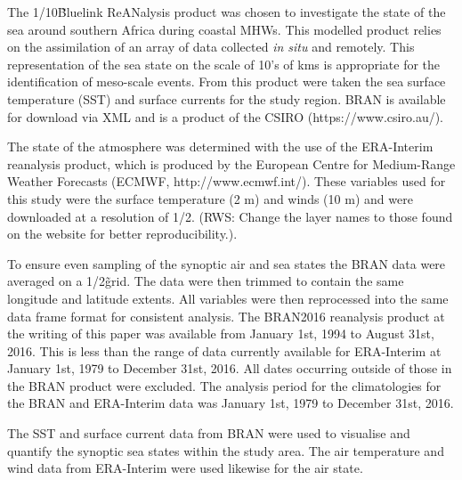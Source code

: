 \documentclass[a4paper,10pt,review]{elsarticle}
\begin{document}
The 1/10\degree\~ Bluelink ReANalysis product was chosen to investigate the state of the sea around southern Africa during coastal MHWs. This modelled product relies on the assimilation of an array of data collected \emph{in situ} and remotely. This representation of the sea state on the scale of 10's of kms is appropriate for the identification of meso-scale events. From this product were taken the sea surface temperature (SST) and surface currents for the study region. BRAN is available for download via XML and is a product of the CSIRO (https://www.csiro.au/).

The state of the atmosphere was determined with the use of the ERA-Interim reanalysis product, which is produced by the European Centre for Medium-Range Weather Forecasts (ECMWF, http://www.ecmwf.int/). These variables used for this study were the surface temperature (2 m) and winds (10 m) and were downloaded at a resolution of 1/2\degree. (RWS: Change the layer names to those found on the website for better reproducibility.). 

To ensure even sampling of the synoptic air and sea states the BRAN data were averaged on a 1/2\degree\~ grid. The data were then trimmed to contain the same longitude and latitude extents. All variables were then reprocessed into the same data frame format for consistent analysis. The BRAN2016 reanalysis product at the writing of this paper was available from January 1st, 1994 to August 31st, 2016. This is less than the range of data currently available for ERA-Interim at January 1st, 1979 to December 31st, 2016. All dates occurring outside of those in the BRAN product were excluded. The analysis period for the climatologies for the BRAN and ERA-Interim data was January 1st, 1979 to December 31st, 2016.

The SST and surface current data from BRAN were used to visualise and quantify the synoptic sea states within the study area. The air temperature and wind data from ERA-Interim were used likewise for the air state.
\end{document}
